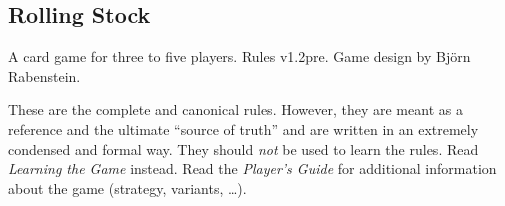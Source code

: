 \documentclass[8pt]{extarticle}
\begin{document}
\begin{center}
\section*{Rolling Stock}

A card game for three to five players. Rules v1.2pre. Game design by
Björn Rabenstein.
\end{center}

These are the complete and canonical rules. However, they are meant as
a reference and the ultimate ``source of truth'' and are written in an
extremely condensed and formal way. They should \emph{not} be used to
learn the rules. Read \emph{Learning the Game} instead.  Read the
\emph{Player's Guide} for additional information about the game
(strategy, variants, \dots).
\end{document}
